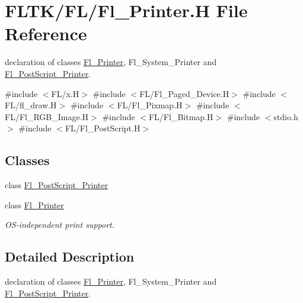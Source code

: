 \hypertarget{_fl___printer_8_h}{}\section{F\+L\+T\+K/\+F\+L/\+Fl\+\_\+\+Printer.H File Reference}
\label{_fl___printer_8_h}


declaration of classes \hyperlink{class_fl___printer}{Fl\+\_\+\+Printer}, Fl\+\_\+\+System\+\_\+\+Printer and \hyperlink{class_fl___post_script___printer}{Fl\+\_\+\+Post\+Script\+\_\+\+Printer}.  


{\ttfamily \#include $<$F\+L/x.\+H$>$}\newline
{\ttfamily \#include $<$F\+L/\+Fl\+\_\+\+Paged\+\_\+\+Device.\+H$>$}\newline
{\ttfamily \#include $<$F\+L/fl\+\_\+draw.\+H$>$}\newline
{\ttfamily \#include $<$F\+L/\+Fl\+\_\+\+Pixmap.\+H$>$}\newline
{\ttfamily \#include $<$F\+L/\+Fl\+\_\+\+R\+G\+B\+\_\+\+Image.\+H$>$}\newline
{\ttfamily \#include $<$F\+L/\+Fl\+\_\+\+Bitmap.\+H$>$}\newline
{\ttfamily \#include $<$stdio.\+h$>$}\newline
{\ttfamily \#include $<$F\+L/\+Fl\+\_\+\+Post\+Script.\+H$>$}\newline
\subsection*{Classes}
\begin{DoxyCompactItemize}
\item 
class \hyperlink{class_fl___post_script___printer}{Fl\+\_\+\+Post\+Script\+\_\+\+Printer}
\item 
class \hyperlink{class_fl___printer}{Fl\+\_\+\+Printer}
\begin{DoxyCompactList}\small\item\em O\+S-\/independent print support. \end{DoxyCompactList}\end{DoxyCompactItemize}


\subsection{Detailed Description}
declaration of classes \hyperlink{class_fl___printer}{Fl\+\_\+\+Printer}, Fl\+\_\+\+System\+\_\+\+Printer and \hyperlink{class_fl___post_script___printer}{Fl\+\_\+\+Post\+Script\+\_\+\+Printer}. 

